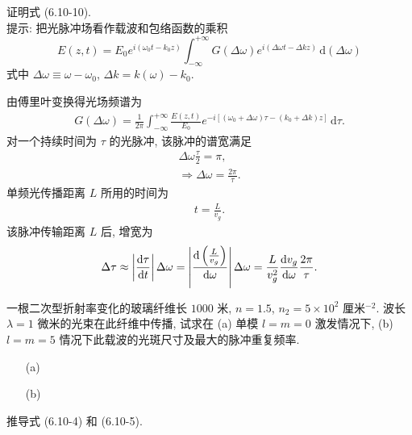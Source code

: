 \documentclass{note}
\begin{document}
\begin{exe}
    证明式 (6.10-10).\\
    提示: 把光脉冲场看作载波和包络函数的乘积
    \[
        E(z,t)=E_0e^{i(\omega_0t-k_0z)}\int_{-\infty}^{+\infty}G(\Delta\omega)e^{i(\Delta\omega t-\Delta kz)}\,\mathrm{d}(\Delta\omega)
    \]
    式中 $\Delta\omega\equiv\omega-\omega_0$, $\Delta k=k(\omega)-k_0$.
\end{exe}
\begin{pf}
    由傅里叶变换得光场频谱为
    \begin{align}
        G(\Delta\omega)=\frac{1}{2\pi}\int_{-\infty}^{+\infty}\frac{E(z,t)}{E_0}e^{-i[(\omega_0+\Delta\omega)\tau-(k_0+\Delta k)z]}\,\mathrm{d}\tau.
    \end{align}
    对一个持续时间为 $\tau$ 的光脉冲, 该脉冲的谱宽满足
    \begin{gather}
        \Delta\omega\frac{\tau}{2}=\pi,\\
        \Longrightarrow\Delta\omega=\frac{2\pi}{\tau}.
    \end{gather}
    单频光传播距离 $L$ 所用的时间为
    \begin{align}
        t=\frac{L}{v_g}.
    \end{align}
    该脉冲传输距离 $L$ 后, 增宽为
    \begin{align}
        \Delta\tau\approx\left\lvert\frac{\mathrm{d}\tau}{\mathrm{d}t}\right\rvert\Delta\omega=\left\lvert\frac{\mathrm{d}\left(\frac{L}{v_g}\right)}{\mathrm{d}\omega}\right\rvert\Delta\omega=\frac{L}{v_g^2}\frac{\mathrm{d}v_g}{\mathrm{d}\omega}\frac{2\pi}{\tau}.
    \end{align}
\end{pf}

\begin{exe}
    一根二次型折射率变化的玻璃纤维长 $1000$ 米, $n=1.5$, $n_2=5\times 10^2$ 厘米${}^{-2}$. 波长 $\lambda=1$ 微米的光束在此纤维中传播, 试求在 (a) 单模 $l=m=0$ 激发情况下, (b) $l=m=5$ 情况下此载波的光斑尺寸及最大的脉冲重复频率.
\end{exe}
\begin{sol}
    \begin{itemize}
        \item[(a)] 
        \item[(b)] 
    \end{itemize}
\end{sol}

\begin{exe}
    推导式 (6.10-4) 和 (6.10-5).
\end{exe}
\begin{pf}
    
\end{pf}
\ifx\allfiles\undefined
\end{document}
